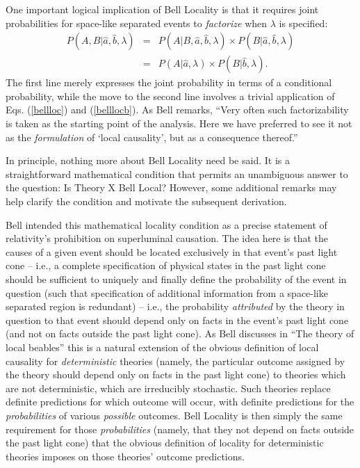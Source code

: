 \documentclass[aps,prc,onecolumn,12pt,nofootinbib]{revtex4-2}
\begin{document}
One important logical implication of Bell Locality is that it requires
joint probabilities for space-like separated events to
\emph{factorize} when $\lambda$ is specified:
\begin{eqnarray}
P(A,B|\hat{a},\hat{b},\lambda) &=& P(A|B,\hat{a},\hat{b},\lambda)
\times P(B|\hat{a},\hat{b},\lambda) \nonumber \\
&=& P(A|\hat{a},\lambda) \times P(B|\hat{b},\lambda).
\label{factorize}
\end{eqnarray}
The first line merely expresses the joint probability in terms of a
conditional probability, while the move to the second line involves a
trivial application of Eqs. (\ref{bellloc}) and (\ref{belllocb}).
As Bell remarks, ``Very often
such factorizability is taken as the starting point of the analysis.
Here we have preferred to see it not as the \emph{formulation} of
`local causality', but as a consequence thereof.'' \cite[pg 243]{bell}

In principle, nothing more about Bell Locality need be said.  It is a
straightforward mathematical condition that permits an unambiguous
answer to the question:  Is Theory X Bell Local?  However, some
additional remarks may help clarify the condition and motivate the
subsequent derivation.

Bell intended this mathematical locality condition as a precise
statement of relativity's prohibition on superluminal causation.  The
idea here is that the causes of a given event should be located
exclusively in that event's past light cone -- i.e., a complete
specification of physical states in the past light cone should be
sufficient to uniquely and finally define the probability of the
event in question (such that specification of additional information
from a space-like separated region is redundant) -- i.e., the
probability \emph{attributed} by the theory in question to that event
should depend only on facts in the event's past light cone (and not on
facts outside the past light cone).  As Bell discusses in ``The theory
of local beables'' \cite[pg 52-62]{bell} this is a natural extension
of the obvious definition of local causality for \emph{deterministic}
theories (namely, the particular outcome assigned by the theory should
depend only on facts in the past light cone) to theories which are
not deterministic, which are irreducibly stochastic.  Such theories
replace definite predictions for which outcome will occur, with
definite predictions for the \emph{probabilities} of various
\emph{possible} outcomes.  Bell Locality is then simply the same
requirement for those \emph{probabilities} (namely, that they not depend on
facts outside the past light cone) that the obvious definition of
locality for deterministic theories imposes on those theories' outcome
predictions.
\end{document}
